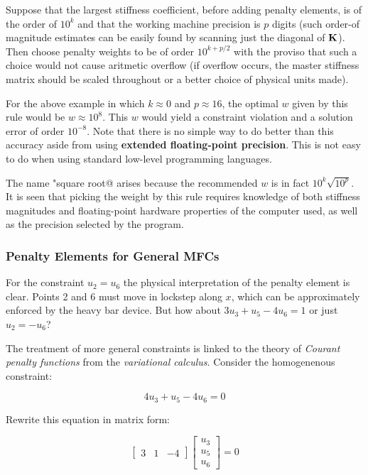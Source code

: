 Suppose that the largest stiffness coefficient, before adding penalty elements,
is of the order of $ 10^k $ and that the working machine precision is $ p $
digits (such order-of magnitude estimates can be easily found by scanning just
the diagonal of $ \mathbf{K} $). Then choose penalty weights to be of order
$ 10^{k+p/2} $ with the proviso that such a choice would not cause aritmetic
overflow (if overflow occurs, the master stiffness matrix should be scaled
throughout or a better choice of physical units made).

For the above example in which $ k \approx 0 $ and $ p \approx 16 $, the
optimal $ w $ given by this rule would be $ w \approx 10^8 $.
This $ w $ would yield a constraint violation and a solution error of order
$ 10^{-8} $. Note that there is no simple way to do better than this accuracy
aside from using \textbf{extended floating-point precision}. This is not
easy to do when using standard low-level programming languages.

The name "square root@ arises because the recommended $ w $ is in fact
$ 10^k \sqrt{10^p} $. It is seen that picking the weight by this rule requires
knowledge of both stiffness magnitudes and floating-point hardware properties
of the computer used, as well as the precision selected by the program.


\subsubsection{Penalty Elements for General MFCs}

For the constraint $ u_2 = u_6 $ the physical interpretation of the penalty
element is clear. Points 2 and 6 must move in lockstep along $ x $, which
can be approximately enforced by the heavy bar device. But how about
$ 3 u_3 + u_5 - 4 u_6 = 1 $ or just $ u_2 = -u_6 $?

The treatment of more general constraints is linked to the theory of
\textit{Courant penalty functions} from the \textit{variational calculus}.
Consider the homogenenous constraint:

\begin{equation}
    4 u_3 + u_5 - 4 u_6 = 0
\end{equation}

Rewrite this equation in matrix form:

\begin{equation}
    \begin{bmatrix}
        3 & 1 & -4
    \end{bmatrix}
    \begin{bmatrix}
        u_3 \\
        u_5 \\
        u_6
    \end{bmatrix}
    = 0
\end{equation}

